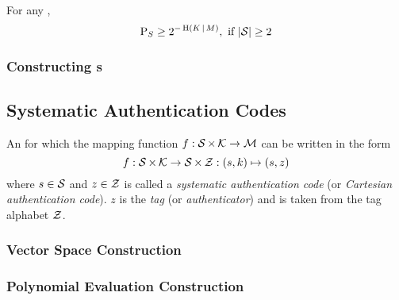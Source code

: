 \begin{theorem}\label{thm:Substitution-Simmons_Bound}
  For any ,
  \begin{equation}\label{eq:Substitution-Simmons_Bound}
    \operatorname{\operatorname{P}}_{S} \geq 2^{-\operatorname{\operatorname{H}}(K \operatorname{\vert} M)}, \text{ if } \lvert \operatorname{\mathcal{S}} \rvert \geq 2
  \end{equation}
\end{theorem}

\subsubsection{Constructing s}\label{subsubsec:Authentication_Code-Construction}
\subsection{Systematic Authentication Codes}\label{subsec:Systematic_Authentication_Codes}
\begin{definition}\label{def:Systematic_Authentication_Code}
  An  for which the mapping function $f : \operatorname{\mathcal{S}} \times \operatorname{\mathcal{K}} \rightarrow \operatorname{\mathcal{M}}$ can be written in the form
  \begin{equation}\label{eq:Systematic_Authentication_Codes}
    f : \operatorname{\mathcal{S}} \times \operatorname{\mathcal{K}} \rightarrow \operatorname{\mathcal{S}} \times \operatorname{\mathcal{Z}} : (s, k) \mapsto (s, z)
  \end{equation}
  where $s \in \operatorname{\mathcal{S}}$ and $z \in \operatorname{\mathcal{Z}}$ is called a \emph{systematic authentication code} (or \emph{Cartesian authentication code}).
  $z$ is the \emph{tag} (or \emph{authenticator}) and is taken from the tag alphabet $\operatorname{\mathcal{Z}}$.
\end{definition}

\subsubsection{Vector Space Construction}\label{subsubsec:Systematic_Authentication_Code-Vector_Space}
\subsubsection{Polynomial Evaluation Construction}\label{subsubsec:Systematic_Authentication_Code-Polynomial_Evaluation}

